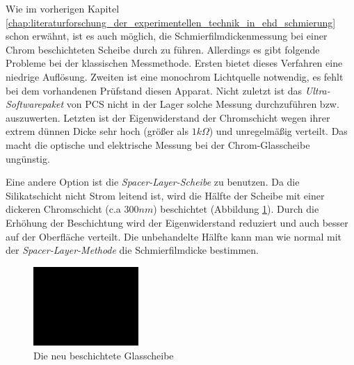 Wie im vorherigen Kapitel \ref{chap:literaturforschung_der_experimentellen_technik_in_ehd_schmierung} schon erwähnt, ist es auch möglich, die Schmierfilmdickenmessung bei einer Chrom beschichteten Scheibe durch zu führen.
Allerdings es gibt folgende Probleme bei der klassischen Messmethode.
Ersten bietet dieses Verfahren eine niedrige Auflösung. Zweiten ist eine monochrom Lichtquelle notwendig, es fehlt bei dem vorhandenen Prüfstand diesen Apparat.
Nicht zuletzt ist das \textit{Ultra-Softwarepaket} von PCS nicht in der Lager solche Messung durchzuführen bzw. auszuwerten.
Letzten ist der Eigenwiderstand der Chromschicht wegen ihrer extrem dünnen Dicke sehr hoch (größer als $1 k\Omega$) und unregelmäßig verteilt.
\label{chap:literaturforschung_der_experimentellen_technik_in_ehd_schmierung}
Das macht die optische und elektrische Messung bei der Chrom-Glasscheibe ungünstig.

Eine andere Option ist die \textit{Spacer-Layer-Scheibe} zu benutzen.
Da die Silikatschicht nicht Strom leitend ist, wird die Hälfte der Scheibe mit einer dickeren Chromschicht (c.a $300 nm$) beschichtet (Abbildung \ref{fig:die_neu_beschichtet_glassscheibe}).
Durch die Erhöhung der Beschichtung wird der Eigenwiderstand reduziert und auch besser auf der Oberfläche verteilt.
Die unbehandelte Hälfte kann man wie normal mit der \textit{Spacer-Layer-Methode} die Schmierfilmdicke bestimmen.
\begin{figure}[htb]
    \centering
    \includegraphics[width=4cm]{./images/blank_img.jpg}
    \caption{Die neu beschichtete Glasscheibe}
    \label{fig:die_neu_beschichtet_glassscheibe}
\end{figure}
%

